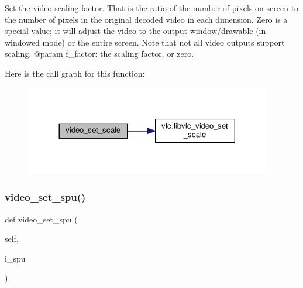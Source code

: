 \begin{DoxyVerb}Set the video scaling factor. That is the ratio of the number of pixels on
screen to the number of pixels in the original decoded video in each
dimension. Zero is a special value; it will adjust the video to the output
window/drawable (in windowed mode) or the entire screen.
Note that not all video outputs support scaling.
@param f_factor: the scaling factor, or zero.
\end{DoxyVerb}
 Here is the call graph for this function\+:
\nopagebreak
\begin{figure}[H]
\begin{center}
\leavevmode
\includegraphics[width=305pt]{classvlc_1_1_media_player_a7a94d14801fa927f859c65e0af3cbe4f_cgraph}
\end{center}
\end{figure}
\mbox{\label{classvlc_1_1_media_player_a41db63f2adaa98b00917f7090c1413e6}} 
\subsubsection{\texorpdfstring{video\+\_\+set\+\_\+spu()}{video\_set\_spu()}}
{\footnotesize\ttfamily def video\+\_\+set\+\_\+spu (\begin{DoxyParamCaption}\item[{}]{self,  }\item[{}]{i\+\_\+spu }\end{DoxyParamCaption})}

